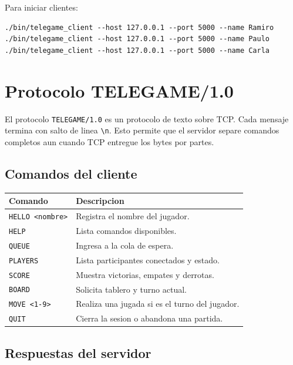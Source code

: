\documentclass[12pt,a4paper]{article}
\begin{document}
Para iniciar clientes:

\begin{lstlisting}[style=code]
./bin/telegame_client --host 127.0.0.1 --port 5000 --name Ramiro
./bin/telegame_client --host 127.0.0.1 --port 5000 --name Paulo
./bin/telegame_client --host 127.0.0.1 --port 5000 --name Carla
\end{lstlisting}

\section{Protocolo TELEGAME/1.0}

El protocolo \texttt{TELEGAME/1.0} es un protocolo de texto sobre TCP. Cada
mensaje termina con salto de linea \texttt{\textbackslash n}. Esto permite que
el servidor separe comandos completos aun cuando TCP entregue los bytes por
partes.

\subsection{Comandos del cliente}

\begin{longtable}{|p{4cm}|p{10cm}|}
\hline
\textbf{Comando} & \textbf{Descripcion} \\
\hline
\texttt{HELLO <nombre>} & Registra el nombre del jugador. \\
\hline
\texttt{HELP} & Lista comandos disponibles. \\
\hline
\texttt{QUEUE} & Ingresa a la cola de espera. \\
\hline
\texttt{PLAYERS} & Lista participantes conectados y estado. \\
\hline
\texttt{SCORE} & Muestra victorias, empates y derrotas. \\
\hline
\texttt{BOARD} & Solicita tablero y turno actual. \\
\hline
\texttt{MOVE <1-9>} & Realiza una jugada si es el turno del jugador. \\
\hline
\texttt{QUIT} & Cierra la sesion o abandona una partida. \\
\hline
\end{longtable}

\subsection{Respuestas del servidor}
\end{document}
